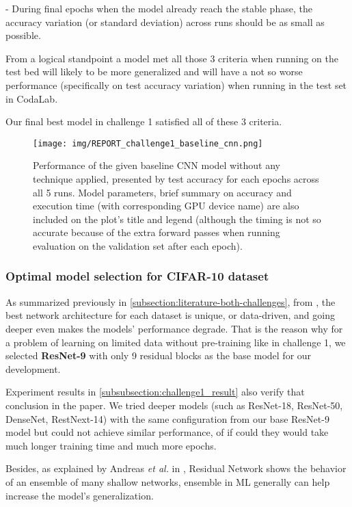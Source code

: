 \documentclass[10pt,twocolumn,letterpaper]{article}
\begin{document}
\hspace{0.2cm}- During final epochs when the model already reach the stable phase, the accuracy variation (or standard deviation) across runs should be as small as possible.

From a logical standpoint a model met all those 3 criteria when running on the test bed will likely to be more generalized and will have a not so worse performance (specifically on test accuracy variation) when running in the test set in CodaLab.

Our final best model in challenge 1 satisfied all of these 3 criteria.  

\begin{figure}[h!]

  \centering
  \texttt{[image: img/REPORT\_challenge1\_baseline\_cnn.png]}
  \caption{Performance of the given baseline CNN model without any technique applied, presented by test accuracy for each epochs across all 5 runs. Model parameters, brief summary on accuracy and execution time (with corresponding GPU device name) are also included on the plot's title and legend (although the timing is not so accurate because of the extra forward passes when running evaluation on the validation set after each epoch).\label{figure:baseline_cnn}}
\end{figure}

\subsubsection{Optimal model selection for CIFAR-10 dataset}
As summarized previously in \ref{subsection:literature-both-challenges}, from \cite{dsouza_structural_2020}, the best network architecture for each dataset is unique, or data-driven, and going deeper even makes the models' performance degrade. That is the reason why for a problem of learning on limited data without pre-training like in challenge 1, we selected \textbf{ResNet-9} with only 9 residual blocks as the base model for our development.

Experiment results in \ref{subsubsection:challenge1_result} also verify that conclusion in the paper. We tried deeper models (such as ResNet-18, ResNet-50, DenseNet, RestNext-14) with the same configuration from our base ResNet-9 model but could not achieve similar performance, of if could they would take much longer training time and much more epochs. 

Besides, as explained by Andreas \textit{et al.} in \cite{andreas16_resnet_ensemble}, Residual Network shows the behavior of an ensemble of many shallow networks, ensemble in ML generally can help increase the model's generalization. 
\end{document}
